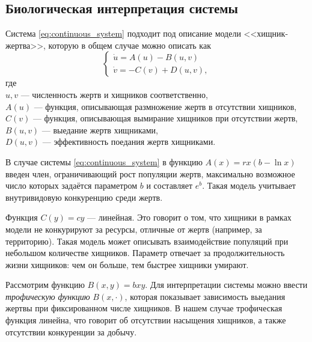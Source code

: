 \subsection{Биологическая интерпретация системы}

Система \ref{eq:continuous_system} подходит под описание модели <<хищник-жертва>>, которую в общем случае можно описать как
$$
        \left\{
        \begin{array}{ll}
                \dot u = A(u) -B(u, v) \\
                \dot v = -C(v) +D(u, v),
        \end{array}
        \right.
$$
где\\
$u, v$ --- численность жертв и хищников соответственно,\\
$A(u)$ --- функция, описывающая размножение жертв в отсутствии хищников, \\
$C(v)$ --- функция, описывающая вымирание хищников при отсутствии жертв, \\
$B(u, v)$ --- выедание жертв хищниками, \\
$D(u, v)$ --- эффективность поедания жертв хищниками. \cite[стр.~137]{bratus10}

В случае системы \ref{eq:continuous_system} в функцию $A(x) = rx(b - \ln x)$ введен член, ограничивающий рост популяции жертв, максимально возможное число которых задаётся параметром $b$ и составляет $e^b$. Такая модель учитывает внутривидовую конкуренцию среди жертв.

Функция $C(y) = cy$ --- линейная. Это говорит о том, что хищники в рамках модели не конкурируют за ресурсы, отличные от жертв (например, за территорию). Такая модель может описывать взаимодействие популяций при небольшом количестве хищников. Параметр отвечает за продолжительность жизни хищников: чем он больше, тем быстрее хищники умирают.

Рассмотрим функцию $B(x, y) = bxy$. Для интерпретации системы можно ввести \textit{трофическую функцию} $B(x, \cdot)$, которая показывает зависимость выедания жертвы при фиксированном числе хищников. В нашем случае трофическая функция линейна, что говорит об отсутствии насыщения хищников, а также отсутствии конкуренции за добычу.
